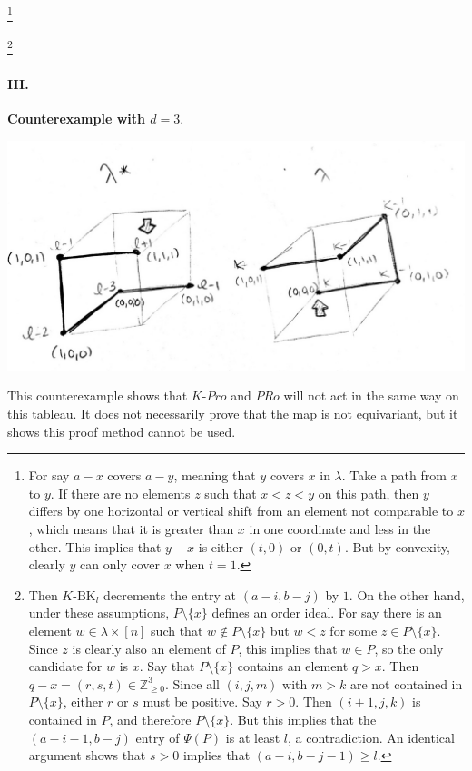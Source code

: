 \documentclass[10pt,letter]{article}
\begin{document}
\footnote{For say $a-x$ covers $a-y$, meaning that $y$ covers $x$ in $\lambda$. Take a path from $x$ to $y$. If there are no elements $z$ such that $x < z < y$ on this path, then $y$ differs by one horizontal or vertical shift from an element not comparable to $x$, which means that it is greater than $x$ in one coordinate and less in the other. This implies that $y-x$ is either $(t,0)$ or $(0,t)$. But by convexity, clearly $y$ can only cover $x$ when $t = 1$.}

\footnote{Then $K$-$\text{BK}_l$ decrements the entry at $(a-i,b-j)$ by $1$. On the other hand, under these assumptions, $P \setminus \lbrace x \rbrace$ defines an order ideal.  For say there is an element $w \in \lambda \times [n]$ such that $w \not \in P \setminus \lbrace x \rbrace$ but $w < z$ for some $z \in P \setminus \lbrace x \rbrace$. Since $z$ is clearly also an element of $P$, this implies that $w \in P$, so the only candidate for $w$ is $x$. Say that $P \setminus \lbrace x \rbrace$ contains an element $q > x$. Then $q-x = (r,s,t) \in \mathbb{Z}_{\geq 0}^3$.  Since all $(i,j,m)$ with $m > k$ are not contained in $P \setminus \lbrace x \rbrace$, either $r$ or $s$ must be positive. Say $r > 0$. Then $(i+1,j,k)$ is contained in $P$, and therefore $P \setminus \lbrace x \rbrace$. But this implies that the $(a-i-1,b-j)$ entry of $\Psi(P)$ is at least $l$, a contradiction. An identical argument shows that $s  > 0$ implies that $(a-i,b-j-1) \geq l$.} 

\paragraph*{III.} \textbf{Counterexample with $d = 3$}.
\begin{center}
\includegraphics[scale=.4]{counterexample_d3.jpg}
\end{center}
This counterexample shows that $K$-$Pro$ and $PRo$ will not act in the same way on this tableau. It does not necessarily prove that the map is not equivariant, but it shows this proof method cannot be used. 
\end{document}
